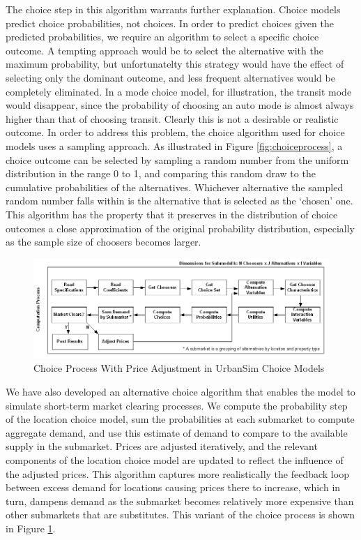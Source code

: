 The choice step in this algorithm warrants further explanation.  Choice models predict choice probabilities, not choices.
In order to predict choices given the predicted probabilities, we require an algorithm to select a specific choice outcome.
A tempting approach would be to select the alternative with the maximum probability, but unfortunatelty this strategy
would have the effect of selecting only the dominant outcome, and less frequent alternatives would be completely
eliminated.  In a mode choice model, for illustration, the transit mode would disappear, since the probability of choosing
an auto mode is almost always higher than that of choosing transit.  Clearly this is not a desirable or realistic outcome.
In order to address this problem, the choice algorithm used for choice models uses a sampling approach.  As illustrated in Figure
\ref{fig:choiceprocess}, a choice outcome can be selected by sampling a random number from the uniform distribution in the range
0 to 1, and comparing this random draw to the cumulative probabilities of the alternatives.  Whichever alternative the sampled
random number falls within is the alternative that is selected as the `chosen' one.  This algorithm has the property that it
preserves in the distribution of choice outcomes a close approximation of the original probability distribution, especially
as the sample size of choosers becomes larger.

\begin{figure}[htp]
\center
 \includegraphics[width=6.5in]
 {graphics/ChoiceProcessWithPriceAdjustment.png}
\caption{Choice Process With Price Adjustment in UrbanSim Choice Models}
\label{fig:choiceprocesswithprice}
\end{figure}

We have also developed an alternative choice algorithm that enables the model to simulate short-term market clearing
processes.  We compute the probability step of the location choice model, sum the probabilities at each submarket to compute
aggregate demand, and use this estimate of demand to compare to the available supply in the submarket.  Prices are adjusted
iteratively, and the relevant components of the location choice model are updated to reflect the influence of the adjusted
prices.  This algorithm captures more realistically the feedback loop between excess demand for locations causing prices there
to increase, which in turn, dampens demand as the submarket becomes relatively more expensive than other submarkets that
are substitutes.  This variant of the choice process is shown in Figure \ref{fig:choiceprocesswithprice}.


